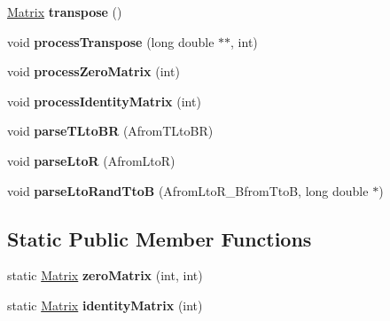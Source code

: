\begin{DoxyCompactItemize}
\item 
\hypertarget{classMatrix_ae23f817021383e3c8636a714dcba1d21}{\hyperlink{classMatrix}{Matrix} {\bfseries transpose} ()}\label{classMatrix_ae23f817021383e3c8636a714dcba1d21}

\item 
\hypertarget{classMatrix_a38760a3f67dbada3cf06e93cdd024d1e}{void {\bfseries process\-Transpose} (long double $\ast$$\ast$, int)}\label{classMatrix_a38760a3f67dbada3cf06e93cdd024d1e}

\item 
\hypertarget{classMatrix_a137f206988d5f7a8fc2cc408aa00eb78}{void {\bfseries process\-Zero\-Matrix} (int)}\label{classMatrix_a137f206988d5f7a8fc2cc408aa00eb78}

\item 
\hypertarget{classMatrix_a3fe4221929da31dc36ac762105e791df}{void {\bfseries process\-Identity\-Matrix} (int)}\label{classMatrix_a3fe4221929da31dc36ac762105e791df}

\item 
\hypertarget{classMatrix_af7f98e4050e3ae8074db5bd9f6e50b3d}{void {\bfseries parse\-T\-Lto\-B\-R} (Afrom\-T\-Lto\-B\-R)}\label{classMatrix_af7f98e4050e3ae8074db5bd9f6e50b3d}

\item 
\hypertarget{classMatrix_a36a6c6d0e8929df6ec285fa9885bbdbc}{void {\bfseries parse\-Lto\-R} (Afrom\-Lto\-R)}\label{classMatrix_a36a6c6d0e8929df6ec285fa9885bbdbc}

\item 
\hypertarget{classMatrix_a8be34c284ac86471c62e767fc4a3f661}{void {\bfseries parse\-Lto\-Rand\-Tto\-B} (Afrom\-Lto\-R\-\_\-\-Bfrom\-Tto\-B, long double $\ast$)}\label{classMatrix_a8be34c284ac86471c62e767fc4a3f661}

\end{DoxyCompactItemize}
\subsection*{Static Public Member Functions}
\begin{DoxyCompactItemize}
\item 
\hypertarget{classMatrix_abf2e3a6c7d5961e5a001700e4a9b642e}{static \hyperlink{classMatrix}{Matrix} {\bfseries zero\-Matrix} (int, int)}\label{classMatrix_abf2e3a6c7d5961e5a001700e4a9b642e}

\item 
\hypertarget{classMatrix_a6c17418c01173943e433c8e8dc3ca2c5}{static \hyperlink{classMatrix}{Matrix} {\bfseries identity\-Matrix} (int)}\label{classMatrix_a6c17418c01173943e433c8e8dc3ca2c5}

\end{DoxyCompactItemize}
